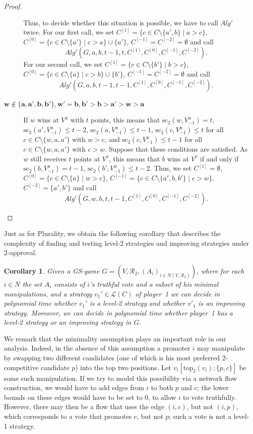 \documentclass[11pt]{article}
\newtheorem{corollary}[theorem]{Corollary}
\newcommand{\calR}{\mathcal{R}}
\newcommand{\calL}{\mathcal{L}}
\newcommand{\calA}{\mathit{Alg}}
\newcommand{\tp}{\mathrm{top}}
\newcommand{\scr}{\mathrm{sc}}
\begin{document}
\begin{proof}
\begin{description}
Thus, to decide whether this situation is possible, we have to call $\calA'$ twice.
For our first call, we set 
$C^{[1]}=\{c\in C\setminus\{a', b\}\mid a > c\}$, 
$C^{[0]}=\{c\in C\setminus\{a'\}\mid c > a\}\cup \{a'\}$, 
$C^{[-1]}=C^{[-2]}=\emptyset$ and call
$$
\calA'(G, a, b, t-1, t, C^{[1]}, C^{[0]}, C^{[-1]}, C^{[-2]}).
$$
For our second call, we set $C^{[1]}=\{c\in C\setminus\{b'\}\mid b > c\}$, 
$C^{[0]}= \{c\in C\setminus\{a\}\mid c > b\}\cup\{b'\}$, 
$C^{[-1]}=C^{[-2]}=\emptyset$ and call
$$
\calA'(G, a, b, t-1, t-1, C^{[1]}, C^{[0]}, C^{[-1]}, C^{[-2]}).
$$

\item[$\boldsymbol{w\not\in\{a, a', b, b'\}, w'=b, b' > b > a' > w > a}$\ \ ] 
If $w$ wins at $V^u$ with $t$ points, this means that 
$\scr_2(w, V^{u}_{-1})=t$, $\scr_2(a', V^u_{-1})\le t-2$, $\scr_2(a, V^u_{-1})\le t-1$,
$\scr_2(c, V^u_{-1})\le t$ for all $c\in C\setminus\{w, a, a'\}$ with $w > c$, and
$\scr_2(c, V^u_{-1})\le t-1$ for all $c\in C\setminus\{w, a, a'\}$ with $c > w$.
Suppose that these conditions are satisfied. As $w$ still receives $t$ points at $V^v$, 
this means that $b$ wins at $V^v$ if and only if $\scr_2(b, V^{u}_{-1})=t-1$,
$\scr_2(b', V^{u}_{-1})\le t-2$.
Thus, we set $C^{[1]}=\emptyset$, $C^{[0]}=\{c\in C\setminus\{a\}\mid w > c\}$, 
$C^{[-1]}=\{c\in C\setminus\{a', b, b'\}\mid c > w\}$, $C^{[-2]}=\{a', b'\}$ and call
$$
\calA'(G, w, b, t, t-1, C^{[1]}, C^{[0]}, C^{[-1]}, C^{[-2]}).
$$
\end{description}

\end{proof}

Just as for Plurality, we obtain the following corollary that describes the complexity 
of finding and testing level-2 strategies and improving strategies under 2-approval.

\begin{corollary}
Given a GS-game $G=(V, \calR_2, (A_i)_{i\in N(V, \calR_2)})$, where for each $i\in N$
the set $A_i$ consists of $i$'s truthful vote and a subset of his minimal manipulations, 
and a strategy $v_1'\in \calL(C)$ of player~1 we can decide in polynomial time
whether $v_1'$ is a level-2 strategy and whether $v'_1$ is an improving strategy. 
Moreover, we can decide in polynomial time whether player~1 has a level-2 strategy 
or an improving strategy in $G$.
\end{corollary}

We remark that the minimality assumption plays an important role in our analysis.
Indeed, in the absence of this assumption a promoter $i$ may manipulate by swapping
two different candidates (one of which is his most preferred 2-competitive candidate $p$)
into the top two positions. Let $v_i[\tp_2(v_i);\{p, c\}]$ be some such manipulation.
If we try to model this possibility via a network flow construction, we would have to add
edges from $i$ to both $p$ and $c$; the lower bounds on these edges would have to be set to 0, 
to allow $i$ to vote truthfully. However, there may then be a flow that uses
the edge $(i, c)$, but not $(i, p)$, which corresponds to 
a vote that promotes $c$, but not $p$; such a vote is not a level-1 strategy.
\end{document}
